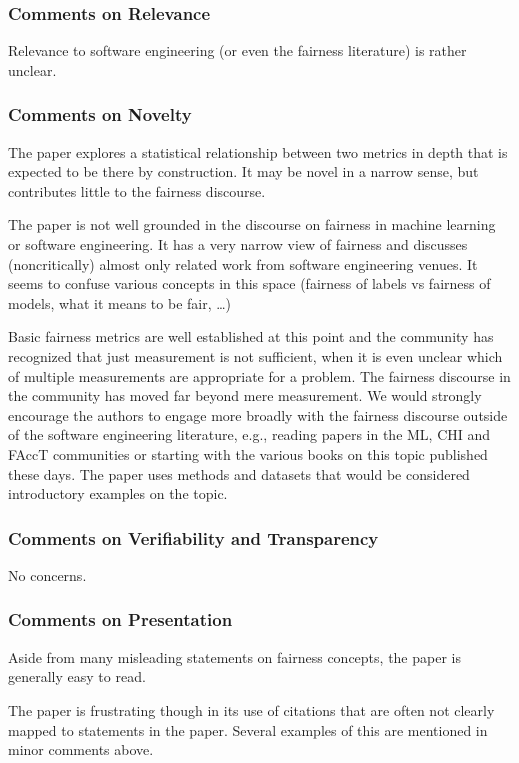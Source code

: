 \documentclass[conference,review,anonymous]{IEEEtran}
\begin{document}
\subsubsection{Comments on Relevance}
Relevance to software engineering (or even the fairness literature) is
rather unclear.
\subsubsection{Comments on Novelty}
The paper explores a statistical relationship between two metrics in
depth that is expected to be there by construction. It may be novel in
a narrow sense, but contributes little to the fairness discourse.

The paper is not well grounded in the discourse on fairness in machine
learning or software engineering. It has a very narrow view of
fairness and discusses (noncritically) almost only related work from
software engineering venues. It seems to confuse various concepts in
this space (fairness of labels vs fairness of models, what it means to
be fair, …)

Basic fairness metrics are well established at this point and the
community has recognized that just measurement is not sufficient, when
it is even unclear which of multiple measurements are appropriate for
a problem. The fairness discourse in the community has moved far
beyond mere measurement. We would strongly encourage the authors to
engage more broadly with the fairness discourse outside of the
software engineering literature, e.g., reading papers in the ML, CHI
and FAccT communities or starting with the various books on this topic
published these days. The paper uses methods and datasets that would
be considered introductory examples on the topic.

\subsubsection{Comments on Verifiability and Transparency}
No concerns.

\subsubsection{Comments on Presentation}
Aside from many misleading statements on fairness concepts, the paper
is generally easy to read.

The paper is frustrating though in its use of citations that are often
not clearly mapped to statements in the paper. Several examples of
this are mentioned in minor comments above.
\end{document}
